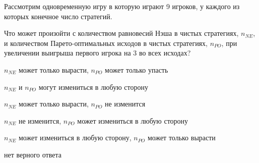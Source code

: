 
\begin{question}
Рассмотрим одновременную игру в которую играют 9 игроков, у каждого из
которых конечное число стратегий.

Что может произойти с количеством равновесий Нэша в чистых стратегиях,
\(n_{NE}\), и количеством Парето-оптимальных исходов в чистых
стратегиях, \(n_{PO}\), при увеличении выигрыша первого игрока на 3 во
всех исходах?
\begin{answerlist}
  \item \(n_{NE}\) может только вырасти, \(n_{PO}\) может только упасть
  \item \(n_{NE}\) и \(n_{PO}\) могут измениться в любую сторону
  \item \(n_{NE}\) может только вырасти, \(n_{PO}\) не изменится
  \item \(n_{NE}\) не изменится, \(n_{PO}\) может измениться в любую сторону
  \item \(n_{NE}\) может измениться в любую сторону, \(n_{PO}\) может только
вырасти
  \item нет верного ответа
\end{answerlist}
\end{question}


